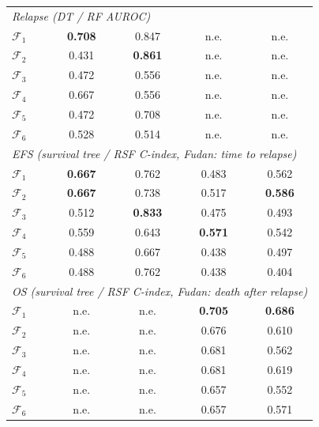 \documentclass[pdflatex,sn-nature]{sn-jnl}
\begin{document}
\begin{appendices}
\begin{table}[p]
\begin{tabular}{@{}l cc cc@{}}
\multicolumn{5}{l}{\textit{Relapse (DT / RF AUROC)}} \\
$\mathcal{F}_1$ & \textbf{0.708} & 0.847 & n.e. & n.e. \\
$\mathcal{F}_2$ & 0.431 & \textbf{0.861} & n.e. & n.e. \\
$\mathcal{F}_3$ & 0.472 & 0.556 & n.e. & n.e. \\
$\mathcal{F}_4$ & 0.667 & 0.556 & n.e. & n.e. \\
$\mathcal{F}_5$ & 0.472 & 0.708 & n.e. & n.e. \\
$\mathcal{F}_6$ & 0.528 & 0.514 & n.e. & n.e. \\
\multicolumn{5}{l}{\textit{EFS (survival tree / RSF C-index, Fudan: time to relapse)}} \\
$\mathcal{F}_1$ & \textbf{0.667} & 0.762 & 0.483 & 0.562 \\
$\mathcal{F}_2$ & \textbf{0.667} & 0.738 & 0.517 & \textbf{0.586} \\
$\mathcal{F}_3$ & 0.512 & \textbf{0.833} & 0.475 & 0.493 \\
$\mathcal{F}_4$ & 0.559 & 0.643 & \textbf{0.571} & 0.542 \\
$\mathcal{F}_5$ & 0.488 & 0.667 & 0.438 & 0.497 \\
$\mathcal{F}_6$ & 0.488 & 0.762 & 0.438 & 0.404 \\
\multicolumn{5}{l}{\textit{OS (survival tree / RSF C-index, Fudan: death after relapse)}} \\
$\mathcal{F}_1$ & n.e. & n.e. & \textbf{0.705} & \textbf{0.686} \\
$\mathcal{F}_2$ & n.e. & n.e. & 0.676 & 0.610 \\
$\mathcal{F}_3$ & n.e. & n.e. & 0.681 & 0.562 \\
$\mathcal{F}_4$ & n.e. & n.e. & 0.681 & 0.619 \\
$\mathcal{F}_5$ & n.e. & n.e. & 0.657 & 0.552 \\
$\mathcal{F}_6$ & n.e. & n.e. & 0.657 & 0.571 \\
\bottomrule
\end{tabular}
\end{table}

\clearpage


\end{appendices}
\end{document}
